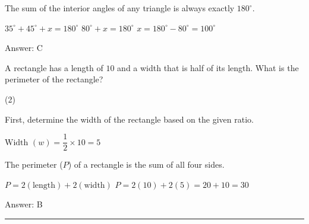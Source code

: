 \documentclass[11pt,paper=a4,answers]{exam}
\begin{document}
\begin{questions}
\begin{solution}
The sum of the interior angles of any triangle is always exactly $180^\circ$.
\vspace{5pt}
\begin{center}
$35^\circ + 45^\circ + x = 180^\circ$
\vspace{5pt}
$80^\circ + x = 180^\circ$
\vspace{5pt}
$x = 180^\circ - 80^\circ = 100^\circ$
\end{center}
\vspace{5pt}
Answer: \colorbox{yellow!100}{C}
\end{solution}

\vspace{1cm}

\question
A rectangle has a length of $10$ and a width that is half of its length. What is the perimeter of the rectangle?
\begin{tasks}(2)
\end{tasks}

\begin{solution}
First, determine the width of the rectangle based on the given ratio.
\vspace{5pt}
\begin{center}
$\text{Width } (w) = \dfrac{1}{2} \times 10 = 5$
\end{center}
\vspace{5pt}
The perimeter ($P$) of a rectangle is the sum of all four sides.
\vspace{5pt}
\begin{center}
$P = 2(\text{length}) + 2(\text{width})$
\vspace{5pt}
$P = 2(10) + 2(5) = 20 + 10 = 30$
\end{center}
\vspace{5pt}
Answer: \colorbox{yellow!100}{B}
\end{solution}


\end{questions}
\begin{center}
\rule{.5\textwidth}{1pt}
\end{center}
\end{document}
